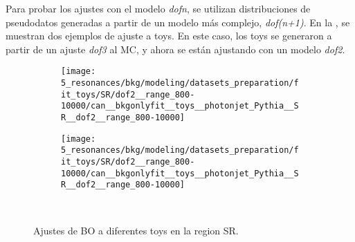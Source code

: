 Para probar los ajustes con el modelo \textit{dofn}, se utilizan distribuciones de pseudodatos generadas a partir de un modelo más complejo, \textit{dof(n+1)}. En la \Fig{\ref{fig:bkg:modeling:preparation:toys:bkgonly_examples_toys_fits}}, se muestran dos ejemplos de ajuste a toys. En este caso, los toys se generaron a partir de un ajuste \textit{dof3} al \ac{MC}, y ahora se están ajustando con un modelo \textit{dof2}.

\begin{figure}[ht!]
    \centering
    \begin{subfigure}[h]{0.49\linewidth}
        \centering
        \texttt{[image: 5\_resonances/bkg/modeling/datasets\_preparation/fit\_toys/SR/dof2\_\_range\_800-10000/can\_\_bkgonlyfit\_\_toys\_\_photonjet\_Pythia\_\_SR\_\_dof2\_\_range\_800-10000]}
    \end{subfigure}
    \hfill
    \begin{subfigure}[h]{0.49\linewidth}
        \centering
        \texttt{[image: 5\_resonances/bkg/modeling/datasets\_preparation/fit\_toys/SR/dof2\_\_range\_800-10000/can\_\_bkgonlyfit\_\_toys\_\_photonjet\_Pythia\_\_SR\_\_dof2\_\_range\_800-10000]}
    \end{subfigure}\\
    \caption{Ajustes de \ac{BO} a diferentes toys en la region SR.}
    \label{fig:bkg:modeling:preparation:toys:bkgonly_examples_toys_fits}
\end{figure}

